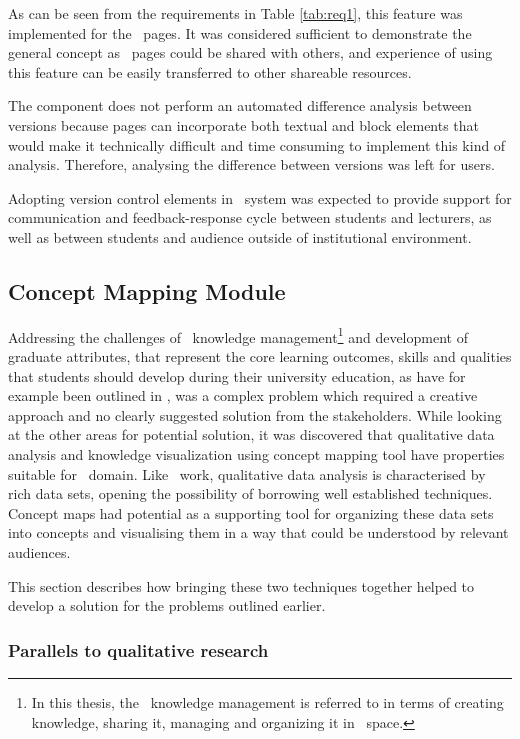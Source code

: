 As can be seen from the requirements in Table \ref{tab:req1}, this feature was
implemented for the \ep~pages. It was considered sufficient to demonstrate the
general concept as \ep~pages could be shared with others, and experience of
using this feature can be easily transferred to other shareable resources.

The component does not perform an automated difference analysis between versions
because pages can incorporate both textual and block elements that would make it
technically difficult and time consuming to implement this kind of analysis.
Therefore, analysing the difference between versions was left for users.
 
Adopting version control elements in \ep~system was expected to provide support
for communication and feedback-response cycle between students and lecturers, as
well as between students and audience outside of institutional environment.

\subsection{Concept Mapping Module}
\label{sec:mapping}
Addressing the challenges of \ep~knowledge management\footnote{In this thesis,
the \ep~knowledge management is referred to in terms of creating knowledge,
sharing it, managing and organizing it in \ep~space.} and development of
graduate attributes, that represent the core learning outcomes, skills and
qualities that students should develop during their university education, as
have for example been outlined in \citet{Hughes2010}, was a complex problem
which required a creative approach and no clearly suggested solution from the
stakeholders. While looking at the other areas for potential solution, it was
discovered that qualitative data analysis and knowledge visualization using
concept mapping tool have properties suitable for \ep~domain. Like \ep~work,
qualitative data analysis is characterised by rich data sets, opening the
possibility of borrowing well established techniques. Concept maps had potential
as a supporting tool for organizing these data sets into concepts and
visualising them in a way that could be understood by relevant audiences.

This section describes how bringing these two techniques together helped to
develop a solution for the problems outlined earlier.

\subsubsection{Parallels to qualitative research}

